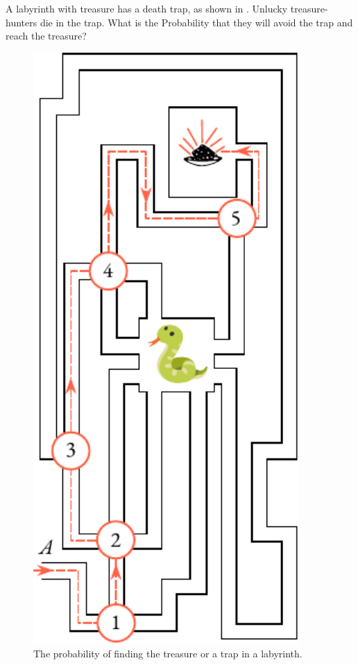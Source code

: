  A labyrinth with treasure has a
death trap, as shown in . Unlucky treasure-hunters
die in the trap. What is the Probability that they will avoid the trap
and reach the treasure?
\begin{figure}
 \centering
 \includegraphics[width=0.9\textwidth]{figures/labyrinth.pdf}
\caption{The probability of finding the treasure or a trap in a labyrinth.\label{labyrinth}}
 \end{figure}
 
